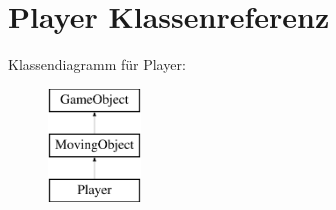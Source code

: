 \hypertarget{classPlayer}{\section{Player Klassenreferenz}
\label{classPlayer}
}
Klassendiagramm für Player\-:\begin{figure}[H]
\begin{center}
\leavevmode
\includegraphics[height=3.000000cm]{classPlayer}
\end{center}
\end{figure}

